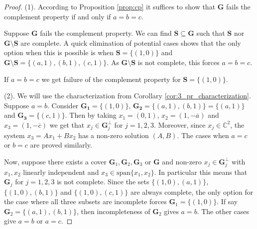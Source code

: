 \documentclass[reqno,a4paper,11pt]{amsart}
\numberwithin{equation}{section}
\def\C{{\mathbb C}}
\newcommand{\lspan}{{\mathrm{span}}}
\newcommand\1{\mathds{1}}
\begin{document}
\begin{proof}
    (1). According to Proposition \ref{prop:cp} it suffices to show that $\mathbf{G}$ fails the complement property if and only if $a=b=c$.

    Suppose $\mathbf{G}$ fails the complement property. We can find $\mathbf{S}\subseteq \mathbf{G}$ such that $\mathbf{S}$ nor $\mathbf{G\setminus S}$ are complete. A quick elimination of potential cases shows that the only option when this is possible is when $\mathbf{S} = \{(1,0)\}$ and $\mathbf{G\setminus S} = \{(a,1),(b,1),(c,1)\}$. As $\mathbf{G\setminus S}$ is not complete, this forces $a=b=c$.

    If $a=b=c$ we get failure of the complement property for $\mathbf{S} = \{(1,0)\}$.
    
    (2). We will use the characterization from Corollary \ref{cor:3_pr_characterization}. Suppose $a=b$. Consider $\mathbf{G_1} = \{(1,0)\}$, $\mathbf{G_2} = \{(a,1),(b,1)\}=\{(a,1)\}$ and $\mathbf{G_3} = \{(c,1)\}$. Then by taking $x_1 = (0,1)$, $x_2 = (1, -\overline{a})$ and $x_3 = (1, -\overline{c})$ we get that $x_j\in \mathbf{G}_j^\perp$ for $j=1,2,3$. Moreover, since $x_j \in \C^2$, the system $x_3 = Ax_1+Bx_2$ has a non-zero solution $(A,B)$. The cases when $a=c$ or $b=c$ are proved similarly.
    
    Now, suppose there exists a cover $\mathbf{G}_1,\mathbf{G}_2,\mathbf{G}_3$ or $\mathbf{G}$ and non-zero $x_j\in\mathbf{G}_j^\perp$ with $x_1,x_2$ linearly independent and $x_3\in \lspan\{x_1,x_2\}$. In particular this means that $\mathbf{G}_j$ for $j=1,2,3$ is not complete. Since the sets $\{(1,0),(a,1)\}$, $\{(1,0),(b,1)\}$ and $\{(1,0),(c,1)\}$ are always complete, the only option for the case where all three subsets are incomplete forces $\mathbf{G}_1 = \{(1,0)\}$. If say $\mathbf{G}_2 = \{(a,1),(b,1)\}$, then incompleteness of $\mathbf{G}_2$ gives $a=b$. The other cases give $a=b$ or $a=c$.


\end{proof}
\end{document}
